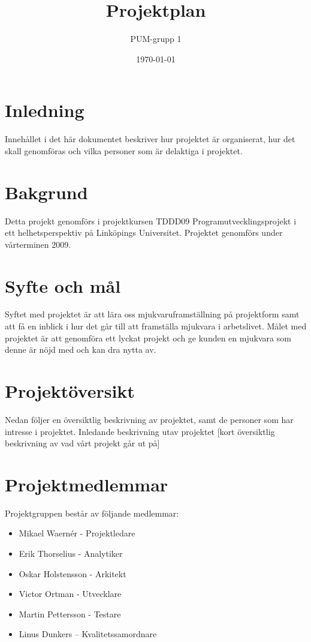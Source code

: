 

\ifpdf
\else
\fi

\title{Projektplan}
\author{PUM-grupp 1}
\date{\today}



\maketitle\thispagestyle{empty}

\newpage

\section{Inledning}
Innehållet i det här dokumentet beskriver hur projektet är organiserat, hur det skall genomföras och vilka personer som är delaktiga i projektet. 
\section{Bakgrund}
Detta projekt genomförs i projektkursen TDDD09 Programutvecklingsprojekt i ett helhetsperspektiv på Linköpings Universitet. Projektet genomförs under vårterminen 2009.
\section{Syfte och mål}
Syftet med projektet är att lära oss mjukvaruframställning på projektform samt att få en inblick i hur det går till att framställa mjukvara i arbetslivet. Målet med projektet är att genomföra ett lyckat projekt och ge kunden en mjukvara som denne är nöjd med och kan dra nytta av.
\section{Projektöversikt}
Nedan följer en översiktlig beskrivning av projektet, samt de personer som har intresse i projektet.
Inledande beskrivning utav projektet
[kort översiktlig beskrivning av vad vårt projekt går ut på]
\section{Projektmedlemmar}
Projektgruppen består av följande medlemmar:
\begin{itemize}
\item Mikael Waernér - Projektledare
\item Erik Thorselius - Analytiker
\item Oskar Holstensson - Arkitekt 
\item Victor Ortman - Utvecklare
\item Martin Pettersson - Testare
\item Linus Dunkers – Kvalitetssamordnare
\end{itemize}
